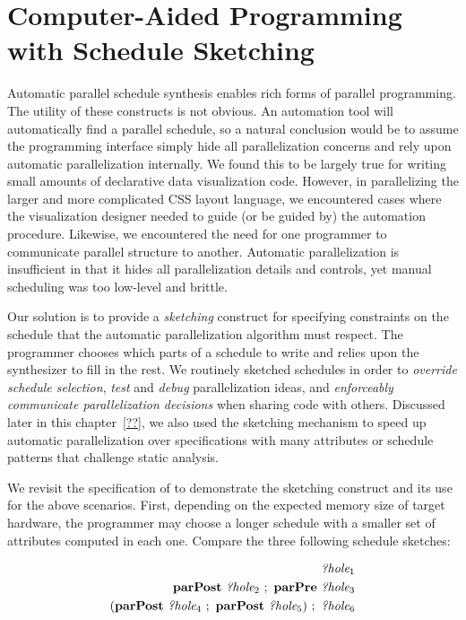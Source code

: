 \section{Computer-Aided Programming with Schedule Sketching}
\label{sec:holes}
Automatic parallel schedule synthesis enables rich forms of parallel programming. The utility of these constructs is not obvious. An automation tool will automatically find a parallel schedule, so a natural conclusion would be to assume the programming interface simply hide all parallelization concerns and rely upon automatic parallelization internally. We found this to be largely true for writing small amounts of declarative data visualization code. However, in parallelizing the larger and more complicated CSS layout language, we encountered cases where the visualization designer needed to guide (or be guided by) the automation procedure. Likewise, we encountered the need for one programmer to communicate parallel structure to another. Automatic parallelization is insufficient in that it hides all parallelization details and controls, yet manual scheduling was too low-level and brittle.

Our solution is to provide a \emph{sketching} construct for specifying constraints on the schedule that the automatic parallelization algorithm must respect. The programmer chooses which parts of a schedule to write and relies upon the synthesizer to fill in the rest. We routinely sketched schedules in order to \emph{override schedule selection}, \emph{test} and \emph{debug} parallelization ideas, and \emph{enforceably communicate parallelization decisions} when sharing code with others. Discussed later in this chapter~\ref{??}, we also used the sketching mechanism to speed up automatic parallelization over specifications with many attributes or schedule patterns that challenge static analysis.

We revisit the specification of \hlang{} to demonstrate the sketching construct and its use for the above scenarios. First, depending on the expected memory size of target hardware, the programmer may choose a longer schedule with a smaller set of attributes computed in each one. Compare the three following schedule sketches:

\begin{align*}
{\emph{?hole}}_1 \\
\text{\textbf{parPost}} ~ {\emph{?hole}}_2 ~ ; ~ \text{\textbf{parPre}} ~ {\emph{?hole}}_3 \\
(\text{\textbf{parPost}} ~ {\emph{?hole}}_4 ~ ; ~  \text{\textbf{parPost}}~ {\emph{?hole}}_5) ~ ; ~{\emph{?hole}}_6 
\end{align*}

